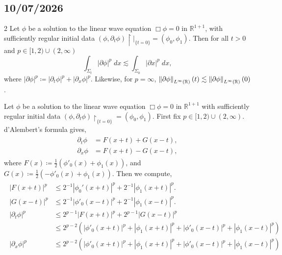 \documentclass{article}
\begin{document}
\subsection{10/07/2026}
\begin{prb}{2}
	Let $\phi$ be a solution to the linear wave equation $\Box\phi = 0$ in $\mathbb{R}^{1 + 1}$, with sufficiently regular initial data $(\phi, \partial_{t}\phi)\upharpoonright|_{\{t = 0\}} = (\phi_{0}, \phi_{1})$. Then for all $t > 0$ and $p \in [1, 2) \cup (2, \infty)$
	\begin{equation*}
		\int_{\Sigma_{t}} |\partial \phi|^{p}\;dx \lesssim \int_{\Sigma_{0}}|\partial x|^{p}\;dx, 
	\end{equation*}
	where $|\partial \phi|^{p} \coloneqq |\partial_{t}\phi|^{p} + |\partial_{x}\phi|^{p}$. Likewise, for $p = \infty$, $\left\Vert \partial \phi \right\Vert_{L^{\infty}(\mathbb{R})}(t) \lesssim \left\Vert \partial \phi \right\Vert_{L^{\infty}(\mathbb{R})}(0)$. 
\end{prb}
Let $\phi$ be a solution to the linear wave equation $\Box\phi = 0$ in $\mathbb{R}^{1 + 1}$ with sufficiently regular initial data $(\phi, \partial_{t}\phi)\upharpoonright_{\{t = 0\}} = (\phi_{0}, \phi_{1})$. First fix $p \in [1,2) \cup (2, \infty)$. d'Alembert's formula gives, 
\begin{align*}
	\begin{split}
		\partial_{t}\phi &= F(x + t) + G(x - t), \\
		\partial_{x}\phi &= F(x + t) - G(x - t), 
	\end{split} 
\end{align*} 
where $F(x) \coloneqq \frac{1}{2}(\phi'_{0}(x) + \phi_{1}(x))$, and $G(x) \coloneqq \frac{1}{2}(-\phi'_{0}(x) + \phi_{1}(x))$. Then we compute, 
\begin{align*}
	\begin{split} 
		|F(x + t)|^{p} &\leq 2^{-1} |\phi_{0}'(x + t)|^{p} + 2^{-1}|\phi_{1}(x + t)|^{p}. \\
		|G(x - t)|^{p} &\leq 2^{-1}|\phi'_{0}(x - t)|^{p} + 2^{-1}|\phi_{1}(x - t)|^{p}. \\
		|\partial_{t}\phi|^{p} &\leq 2^{p-1}|F(x + t)|^{p} + 2^{p - 1}|G(x - t)|^{p} \\
		&\leq 2^{p - 2}\left(|\phi'_{0}(x + t)|^{p} + |\phi_{1}(x + t)|^{p} + |\phi'_{0}(x-t)|^{p} + |\phi_{1}(x - t)|^{p}\right) \\
		|\partial_{x}\phi|^{p} &\leq 2^{p - 2}\left(|\phi'_{0}(x + t)|^{p} + |\phi_{1}(x + t)|^{p} + |\phi'_{0}(x-t)|^{p} + |\phi_{1}(x - t)|^{p}\right)
	\end{split} 
\end{align*} 
\end{document}
